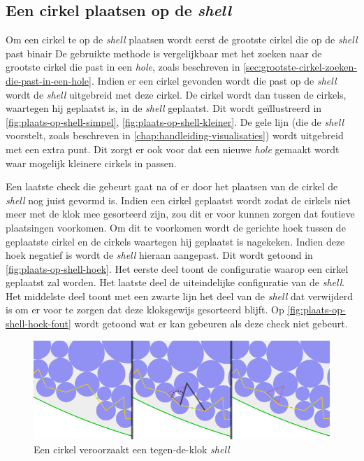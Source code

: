 \documentclass[12pt,a4paper,oneside]{book}
\begin{document}
{\subsection{Een cirkel plaatsen op de \textit{shell}} \label{sec:een-cirkel-plaatsen-op-de-shell}

Om een cirkel te op de \textit{shell} plaatsen wordt eerst de grootste cirkel die op de \textit{shell} past binair %
De gebruikte methode is vergelijkbaar met het zoeken naar de grootste cirkel die past in een \textit{hole}, zoals beschreven in \autoref{sec:grootste-cirkel-zoeken-die-past-in-een-hole}.
Indien er een cirkel gevonden wordt die past op de \textit{shell} wordt de \textit{shell} uitgebreid met deze cirkel.
De cirkel wordt dan tussen de cirkels, waartegen hij geplaatst is, in de \textit{shell} geplaatst.
Dit wordt geïllustreerd in \autoref{fig:plaats-op-shell-simpel}, \autoref{fig:plaats-op-shell-kleiner}.
De gele lijn (die de \textit{shell} voorstelt, zoals beschreven in \autoref{chap:handleiding-visualisaties}) wordt uitgebreid met een extra punt.
Dit zorgt er ook voor dat een nieuwe \textit{hole} gemaakt wordt waar mogelijk kleinere cirkels in passen.

Een laatste check die gebeurt gaat na of er door het plaatsen van de cirkel de \textit{shell} nog juist gevormd is.
Indien een cirkel geplaatst wordt zodat de cirkels niet meer met de klok mee gesorteerd zijn, zou dit er voor kunnen zorgen dat foutieve plaatsingen voorkomen.
Om dit te voorkomen wordt de gerichte hoek tussen de geplaatste cirkel en de cirkels waartegen hij geplaatst is nagekeken.
Indien deze hoek negatief is wordt de \textit{shell} hieraan aangepast.
Dit wordt getoond in \autoref{fig:plaats-op-shell-hoek}.
Het eerste deel toont de configuratie waarop een cirkel geplaatst zal worden.
Het laatste deel de uiteindelijke configuratie van de \textit{shell}.
Het middelste deel toont met een zwarte lijn het deel van de \textit{shell} dat verwijderd is om er voor te zorgen dat deze kloksgewijs gesorteerd blijft.
Op \autoref{fig:plaats-op-shell-hoek-fout}  wordt getoond wat er kan gebeuren als deze check niet gebeurt.

\begin{figure}
  \centering
  \includegraphics[width=1.0\textwidth]{plaats-op-shell-hoek.png}
  \caption{Een cirkel veroorzaakt een tegen-de-klok \textit{shell}} \label{fig:plaats-op-shell-hoek} 
\end{figure}

}
\end{document}
